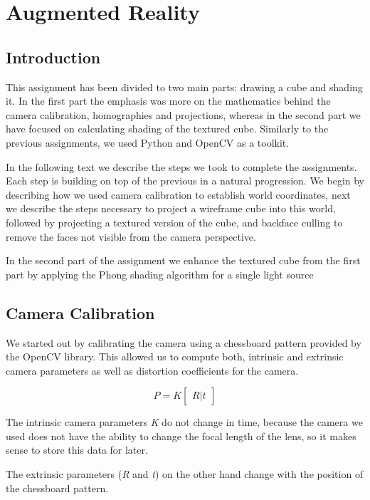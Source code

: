 \pagebreak
\section{Augmented Reality}

\subsection{Introduction}

This assignment has been divided to two main parts: drawing a cube and shading it. In the first part the emphasis was more on the mathematics behind the camera calibration, homographies and projections, whereas in the second part we have focused on calculating shading of the textured cube. Similarly to the previous assignments, we used Python and OpenCV as a toolkit.

In the following text we describe the steps we took to complete the assignments. Each step is building on top of the previous in a natural progression. We begin by describing how we used camera calibration to establish world coordinates, next we describe the steps necessary to project a wireframe cube into this world, followed by projecting a textured version of the cube, and backface culling to remove the faces not visible from the camera perspective.

In the second part of the assignment we enhance the textured cube from the first part by applying the Phong shading algorithm for a single light source


\subsection{Camera Calibration}
We started out by calibrating the camera using a chessboard pattern provided by the OpenCV library. This allowed us to compute both, intrinsic and extrinsic camera parameters as well as distortion coefficients for the camera. 

\begin{equation}
	P = K \begin{bmatrix} R|t \end{bmatrix}
\end{equation}

The intrinsic camera parameters \textit{K} do not change in time, because the camera we used does not have the ability to change the focal length of the lens, so it makes sense to store this data for later. 

The extrinsic parameters (\textit{R} and \textit{t}) on the other hand change with the position of the chessboard pattern.

